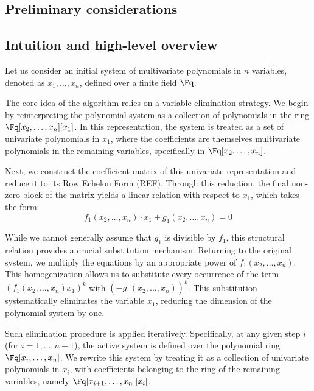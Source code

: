 \subsection{Preliminary considerations}


\subsection{Intuition and high-level overview}
Let us consider an initial system of multivariate polynomials in $n$ variables, denoted as $x_1, \dots, x_n$, defined over a finite field $\Fq$. 

The core idea of the algorithm relies on a variable elimination strategy. We begin by reinterpreting the polynomial system as a collection of polynomials in the ring $\Fq[x_2, \dots, x_n][x_1]$. In this representation, the system is treated as a set of univariate polynomials in $x_1$, where the coefficients are themselves multivariate polynomials in the remaining variables, specifically in $\Fq[x_2, \dots, x_n]$.

Next, we construct the coefficient matrix of this univariate representation and reduce it to its Row Echelon Form (REF). Through this reduction, the final non-zero block of the matrix yields a linear relation with respect to $x_1$, which takes the form:
\begin{equation*}
    f_1(x_2, \dots, x_n)\cdot x_1 + g_1(x_2, \dots, x_n) = 0
    \label{eq:linear_relation_1}
\end{equation*}

While we cannot generally assume that $g_1$ is divisible by $f_1$, this structural relation provides a crucial substitution mechanism. Returning to the original system, we multiply the equations by an appropriate power of $f_1(x_2, \dots, x_n)$. This homogenization allows us to substitute every occurrence of the term $(f_1(x_2, \dots, x_n)x_1)^k$ with $(-g_1(x_2, \dots, x_n))^k$. This substitution systematically eliminates the variable $x_1$, reducing the dimension of the polynomial system by one.

Such elimination procedure is applied iteratively. Specifically, at any given step $i$ (for $i = 1, \dots, n-1$), the active system is defined over the polynomial ring $\Fq[x_i, \dots, x_n]$. We rewrite this system by treating it as a collection of univariate polynomials in $x_i$, with coefficients belonging to the ring of the remaining variables, namely $\Fq[x_{i+1}, \dots, x_n][x_i]$. 

